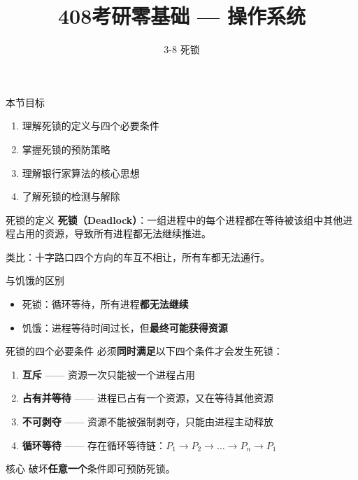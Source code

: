 \documentclass[10pt, aspectratio=169]{beamer}
\title{408考研零基础 --- 操作系统}
\subtitle{3-8 死锁}
\author{}
\date{}
\begin{document}
\begin{frame}{本节目标}
    \begin{enumerate}
        \item 理解死锁的定义与四个必要条件
        \item 掌握死锁的预防策略
        \item 理解银行家算法的核心思想
        \item 了解死锁的检测与解除
    \end{enumerate}
\end{frame}

\begin{frame}{死锁的定义}
    \textbf{死锁（Deadlock）}：一组进程中的每个进程都在等待被该组中其他进程占用的资源，导致所有进程都无法继续推进。

    \vspace{0.5em}
    \begin{exampleblock}
        类比：十字路口四个方向的车互不相让，所有车都无法通行。
    \end{exampleblock}
    \vspace{0.5em}
    \begin{alertblock}{与饥饿的区别}
        \begin{itemize}
            \item 死锁：循环等待，所有进程\textbf{都无法继续}
            \item 饥饿：进程等待时间过长，但\textbf{最终可能获得资源}
        \end{itemize}
    \end{alertblock}
\end{frame}

\begin{frame}{死锁的四个必要条件}
    必须\textbf{同时满足}以下四个条件才会发生死锁：

    \begin{enumerate}
        \item \textbf{互斥} —— 资源一次只能被一个进程占用
        \item \textbf{占有并等待} —— 进程已占有一个资源，又在等待其他资源
        \item \textbf{不可剥夺} —— 资源不能被强制剥夺，只能由进程主动释放
        \item \textbf{循环等待} —— 存在循环等待链：$P_1 \to P_2 \to \dots \to P_n \to P_1$
    \end{enumerate}
    \vspace{0.5em}
    \begin{block}{核心}
        破坏\textbf{任意一个}条件即可预防死锁。
    \end{block}
\end{frame}
\end{document}
